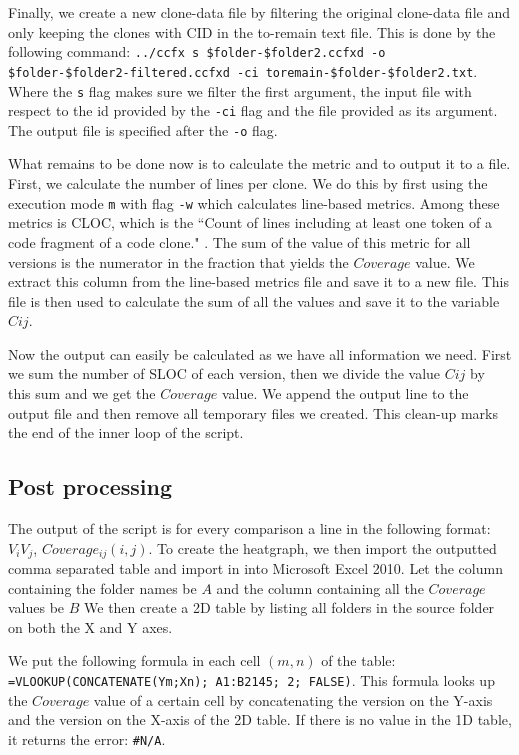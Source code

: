 \documentclass[a4paper,twoside, twocolumn, 11pt]{article}
\numberwithin{equation}{section}
\begin{document}
Finally, we create a new clone-data file by filtering the original clone-data file and only keeping the clones with CID in the to-remain text file.
This is done by the following command: \texttt{../ccfx s \$folder-\$folder2.ccfxd -o \$folder-\$folder2-filtered.ccfxd -ci toremain-\$folder-\$folder2.txt}.
Where the \texttt{s} flag makes sure we filter the first argument, the input file with respect to the id provided by the \texttt{-ci} flag and the file provided as its argument.
The output file is specified after the \texttt{-o} flag.

What remains to be done now is to calculate the metric and to output it to a file.
First, we calculate the number of lines per clone.
We do this by first using the execution mode \texttt{m} with flag \texttt{-w} which calculates line-based metrics.
Among these metrics is CLOC, which is the ``Count of lines including at least one token of a code fragment of a code clone." \cite{gemx tutorial}.
The sum of the value of this metric for all versions is the numerator in the fraction that yields the $Coverage$ value.
We extract this column from the line-based metrics file and save it to a new file.
This file is then used to calculate the sum of all the values and save it to the variable $Cij$.

Now the output can easily be calculated as we have all information we need. 
First we sum the number of SLOC of each version, then we divide the value $Cij$ by this sum and we get the $Coverage$ value.
We append the output line to the output file and then remove all temporary files we created.
This clean-up marks the end of the inner loop of the script.

\subsection{Post processing}
The output of the script is for every comparison a line in the following format: $V_iV_j$, $Coverage_{ij}(i,j)$.
To create the heatgraph, we then import the outputted comma separated table and import in into Microsoft Excel 2010.
Let the column containing the folder names be $A$ and the column containing all the $Coverage$ values be $B$
We then create a 2D table by listing all folders in the source folder on both the X and Y axes.

We put the following formula in each cell $(m,n)$ of the table: 
\texttt{=VLOOKUP(CONCATENATE(Ym;Xn); A1:B2145; 2; FALSE)}.
This formula looks up the $Coverage$ value of a certain cell by concatenating the version on the Y-axis and the version on the X-axis of the 2D table.
If there is no value in the 1D table, it returns the error: \texttt{\#N/A}.
\end{document}

